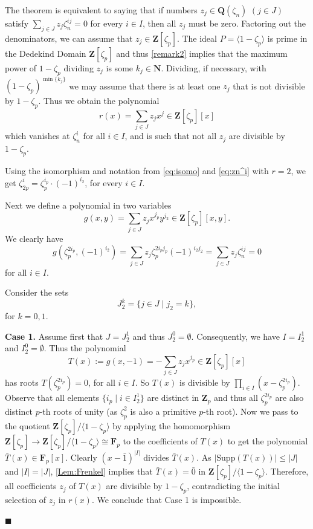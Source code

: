 \documentclass[a4paper,12pt,reqno]{amsart}
\newenvironment{proofofA}{{\bf {Proof of Theorem \ref{Thm:A}.} }}{\hfill $\blacksquare$ \\}
\def\Z{\mathbf{Z}}
\def\N{\mathbf{N}}
\def\Q{\mathbf{Q}}
\def\F{\mathbf{F}}
\def\Supp{\mathrm{Supp}}
\begin{document}
\begin{proofofA}
  The theorem is equivalent to saying that if numbers $z_j \in \Q(\zeta_n)$ $(j \in J)$ satisfy $\sum_{j \in J}z_j \zeta_n^{ij}=0$ for every $i \in I$, then all $z_j$ must be zero. Factoring out the  denominators, we can assume that $z_j \in  \Z[\zeta_p]$.  The ideal $P= \langle 1 - \zeta_p \rangle $ is prime in the Dedekind Domain $\Z[\zeta_p]$ and thus \autoref{remark2} implies that
  the maximum power of $1 - \zeta_p$ dividing $z_j $ is some  $k_j\in \N$. Dividing, if necessary, with $(1-\zeta_p)^{\min\{k_j\}}$ we may assume that there is at least one $z_j$ that is not divisible by $ 1 - \zeta_p$.
Thus we obtain the polynomial 
\begin{equation}\label{eq:s(x)}
r(x) = \sum_{j \in J }z_jx^{j}  \in \Z[\zeta_p][x] 
\end{equation}
which vanishes at $\zeta_n^i$ for all $i \in I$, and is such that  not all $z_j$ are divisible by $1-\zeta_p$.

Using the isomorphism and  notation from \eqref{eq:isomo} and \eqref{eq:zn^i} with $r=2$, we get $\zeta_{2p}^i= \zeta_p^{i_p}  \cdot (-1)^{i_2}$, 
for every $i \in I$.

Next we define a polynomial in two variables 
\begin{equation}\label{eq:g(x)}
g(x,y) = \sum_{j \in J }z_jx^{j_p}y^{j_2}  \in \Z[\zeta_p][x,y]. 
\end{equation}
We clearly have 
\begin{equation}\label{eq:rootsOfg(x)}
g(\zeta_p^{2i_p}, (-1)^{i_2}) = \sum_{j \in J }z_j \zeta_p^{2i_pj_p} (-1)^{i_2j_2} = \sum_{j \in J }z_j \zeta_n^{ij}= 0 
\end{equation}
for all $i \in I$.

Consider the sets 
\begin{equation}\label{eq:I^k}
  J_2^k = \{ j \in J \mid j_2 = k  \},    
\end{equation}
for $k=0,1$.

{\bf Case 1. } Assume first that $J = J_2^1$ and thus $J_2^0 = \emptyset$. Consequently, we have $I = I_2^1$ and $I_2^0 = \emptyset$. Thus  the polynomial 
\[
T(x):= g(x,-1) = - \sum_{j \in J }z_jx^{j_p}  \in \Z[\zeta_p][x]
\]
has  roots 
$T(\zeta_p^{2i_p})=0$,  for all $i \in I$. So $T(x)$ is divisible by $\prod_{i \in I}(x- \zeta_p^{2i_p})$. Observe that all elements $\{ i_p \mid i \in I_2^1\}$  are distinct in $\Z_p$ and thus all $\zeta_p^{2i_p}$ are also distinct $p$-th roots of unity (as $\zeta_p^2$ is also a primitive $p$-th root).
Now we pass to the quotient $\Z[\zeta_p] /\langle 1 - \zeta_p \rangle $ by applying the homomorphism $\Z[\zeta_p] \to \Z[\zeta_p]/\langle 1 - \zeta_p \rangle \cong  \F_p $  to the coefficients of $T(x)$ to get the polynomial  $\bar{T}(x) \in \F_p[x]$. Clearly $(x- \bar{1})^{|I|}$ divides $\bar{T}(x)$. As 
 $|\Supp(T(x))| \leq |J|$  and $|I|=|J|$, \autoref{Lem:Frenkel} implies that $\bar{T}(x) =  \bar{0}$ in $ \Z[\zeta_p]/\langle 1 - \zeta_p \rangle $. Therefore, all coefficients $z_j$ of $T(x)$ are divisible by $1-\zeta_p$, contradicting the initial selection of $z_j$ in $r(x)$. We conclude that Case 1 is impossible.
 

\end{proofofA}
\end{document}
